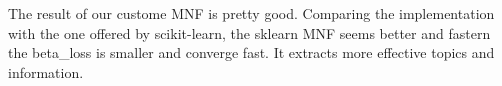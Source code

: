 \documentclass[11pt]{article}
\begin{document}
    The result of our custome MNF is pretty good. Comparing the
implementation with the one offered by scikit-learn, the sklearn MNF
seems better and fastern the beta\_loss is smaller and converge fast. It
extracts more effective topics and information.


    
    
    
    
\end{document}
